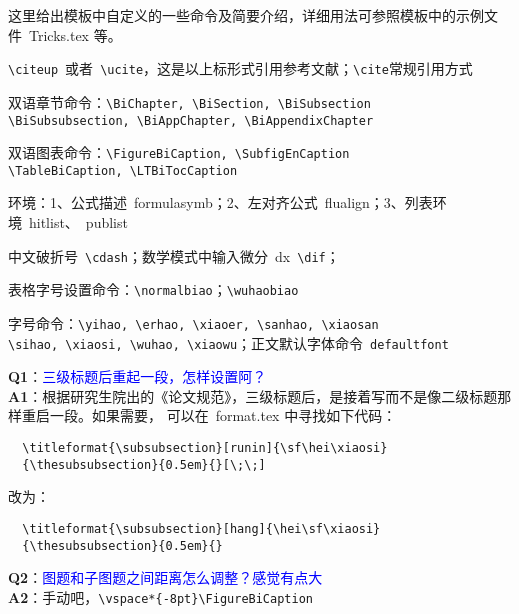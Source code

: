 这里给出模板中自定义的一些命令及简要介绍，详细用法可参照模板中的示例文件~Tricks.tex 等。
\begin{hitlist}
\item \verb+\citeup+~或者~\verb+\ucite+，这是以上标形式引用参考文献；\verb+\cite+常规引用方式
\item 双语章节命令：\verb+\BiChapter, \BiSection, \BiSubsection+\\
\verb+\BiSubsubsection, \BiAppChapter, \BiAppendixChapter+
\item 双语图表命令：\verb+\FigureBiCaption, \SubfigEnCaption+\\
\verb+\TableBiCaption, \LTBiTocCaption+
\item 环境：1、公式描述~formulasymb；2、左对齐公式~flualign；3、列表环境~hitlist、~publist 
\item 中文破折号~\verb+\cdash+；数学模式中输入微分~dx~\verb+\dif+；
\item 表格字号设置命令：\verb+\normalbiao+；\verb+\wuhaobiao+
\item 字号命令：\verb+\yihao, \erhao, \xiaoer, \sanhao, \xiaosan+\\
\verb+\sihao, \xiaosi, \wuhao, \xiaowu+；正文默认字体命令~\verb+defaultfont+
\end{hitlist}


\noindent \textbf{Q1}：\textcolor{blue}{三级标题后重起一段，怎样设置阿？}\\
\textbf{A1}：根据研究生院出的《论文规范》，三级标题后，是接着写而不是像二级标题那样重启一段。如果需要，
可以在~format.tex 中寻找如下代码：
\begin{verbatim}
  \titleformat{\subsubsection}[runin]{\sf\hei\xiaosi}
  {\thesubsubsection}{0.5em}{}[\;\;]
\end{verbatim}
改为：
\begin{verbatim}
  \titleformat{\subsubsection}[hang]{\hei\sf\xiaosi}
  {\thesubsubsection}{0.5em}{}
\end{verbatim}

\noindent \textbf{Q2}：\textcolor{blue}{图题和子图题之间距离怎么调整？感觉有点大}\\
\textbf{A2}：手动吧，\verb+\vspace*{-8pt}\FigureBiCaption+


